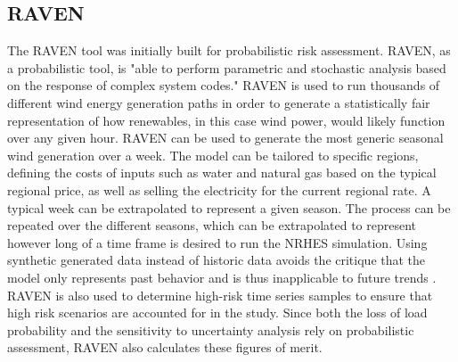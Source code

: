 \documentclass{article}                                                                           %
\begin{document}
\begin{linenumbers}
\subsection{RAVEN}
The RAVEN tool was initially built for probabilistic risk assessment. RAVEN, as a probabilistic tool, is "able to perform parametric and stochastic analysis based on the response of complex system codes\cite{RabitiRAVEN}." RAVEN is used to run thousands of different wind energy generation paths in order to generate a statistically fair representation of how renewables, in this case wind power, would likely function over any given hour. RAVEN can be used to generate the most generic seasonal wind generation over a week. The model can be tailored to specific regions, defining the costs of inputs such as water and natural gas based on the typical regional price, as well as selling the electricity for the current regional rate. A typical week can be extrapolated to represent a given season. The process can be repeated over the different seasons, which can be extrapolated to represent however long of a time frame is desired to run the NRHES simulation. Using synthetic generated data instead of historic data avoids the critique that the model only represents past behavior and is thus inapplicable to future trends \cite{redfoot_epiney_2016}. RAVEN is also used to determine high-risk time series samples to ensure that high risk scenarios are accounted for in the study. Since both the loss of load probability and the sensitivity to uncertainty analysis rely on probabilistic assessment, RAVEN also calculates these figures of merit.


\end{linenumbers}
\end{document}
